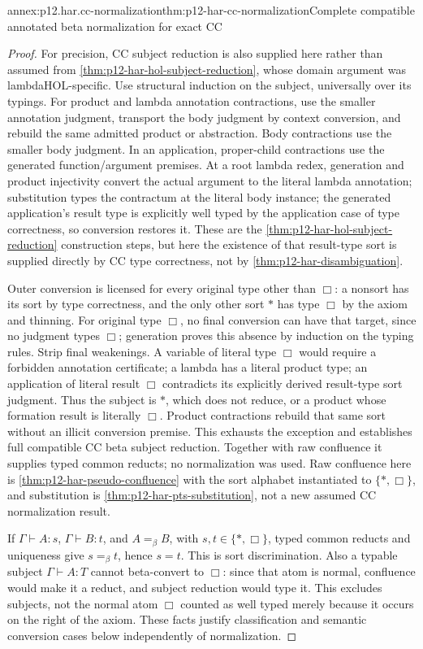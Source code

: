 \begin{annexitem}{annex:p12.har.cc-normalization}{thm:p12-har-cc-normalization}{Complete compatible annotated beta normalization for exact CC}
\begin{proof}
For precision, CC subject reduction is also supplied here rather than
assumed from \cref{thm:p12-har-hol-subject-reduction}, whose domain argument was lambdaHOL-specific.
Use structural induction on the subject, universally over its typings.
For product and lambda annotation contractions, use the smaller
annotation judgment, transport the body judgment by context conversion,
and rebuild the same admitted product or abstraction. Body contractions
use the smaller body judgment. In an application, proper-child contractions
use the generated function/argument premises. At a root lambda redex,
generation and product injectivity convert the actual argument to the
literal lambda annotation; substitution types the contractum at the
literal body instance; the generated application's result type is
explicitly well typed by the application case of type correctness, so
conversion restores it. These are the \cref{thm:p12-har-hol-subject-reduction} construction steps, but here
the existence of that result-type sort is supplied directly by CC type
correctness, not by \cref{thm:p12-har-disambiguation}.

Outer conversion is licensed for every original type other than
\(\Box\): a nonsort has its sort by type correctness, and the only
other sort \(\ast\) has type \(\Box\) by the axiom and thinning.
For original type \(\Box\), no final conversion can have that target,
since no judgment types \(\Box\); generation proves this absence by
induction on the typing rules. Strip final weakenings. A variable of
literal type \(\Box\) would require a forbidden annotation certificate;
a lambda has a literal product type; an application of literal result
\(\Box\) contradicts its explicitly derived result-type sort judgment.
Thus the subject is \(\ast\), which does not reduce, or a product whose
formation result is literally \(\Box\). Product contractions rebuild
that same sort without an illicit conversion premise. This exhausts the
exception and establishes full compatible CC beta subject reduction.
Together with raw confluence it supplies typed common reducts; no
normalization was used. Raw confluence here is \cref{thm:p12-har-pseudo-confluence} with the sort alphabet instantiated
to \(\{\ast,\Box\}\), and substitution is \cref{thm:p12-har-pts-substitution}, not a new assumed CC normalization result.

If \(\Gamma\vdash A:s\), \(\Gamma\vdash B:t\), and \(A=_\beta B\),
with \(s,t\in\{\ast,\Box\}\), typed common reducts and uniqueness
give \(s=_\beta t\), hence \(s=t\). This is sort discrimination.
Also a typable subject \(\Gamma\vdash A:T\) cannot beta-convert to
\(\Box\): since that atom is normal, confluence would make it a
reduct, and subject reduction would type it. This excludes subjects,
not the normal atom \(\Box\) counted as well typed merely because
it occurs on the right of the axiom. These facts justify classification and
semantic conversion cases below independently of normalization.


\end{proof}
\end{annexitem}
